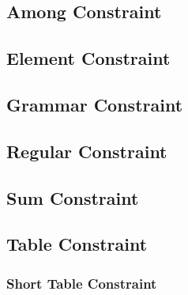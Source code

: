\documentclass[../Document.tex]{subfiles}
\begin{document}

\subsection{Among Constraint}

\subsection{Element Constraint}

\subsection{Grammar Constraint}

\subsection{Regular Constraint}

\subsection{Sum Constraint}

\subsection{Table Constraint}
\subsubsection{Short Table Constraint}
\end{document}
